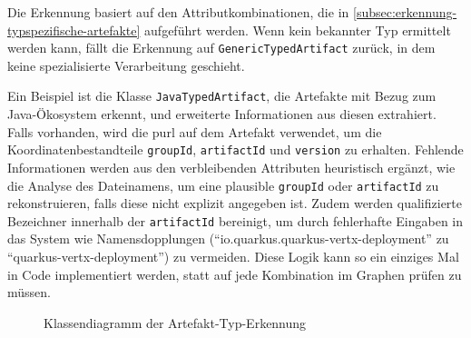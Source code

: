Die Erkennung basiert auf den Attributkombinationen, die in \autoref{subsec:erkennung-typspezifische-artefakte} aufgeführt werden.
Wenn kein bekannter Typ ermittelt werden kann, fällt die Erkennung auf \texttt{GenericTypedArtifact} zurück, in dem keine spezialisierte Verarbeitung geschieht.

Ein Beispiel ist die Klasse \texttt{JavaTypedArtifact}, die Artefakte mit Bezug zum Java-Ökosystem erkennt, und erweiterte Informationen aus diesen extrahiert.
Falls vorhanden, wird die \acrshort{purl} auf dem Artefakt verwendet, um die Koordinatenbestandteile \texttt{groupId}, \texttt{artifactId} und \texttt{version} zu erhalten.
Fehlende Informationen werden aus den verbleibenden Attributen heuristisch ergänzt, wie die Analyse des Dateinamens, um eine plausible \texttt{groupId} oder \texttt{artifactId} zu rekonstruieren, falls diese nicht explizit angegeben ist.
Zudem werden qualifizierte Bezeichner innerhalb der \texttt{artifactId} bereinigt, um durch fehlerhafte Eingaben in das System wie Namensdopplungen (\enquote{io.quarkus.quarkus-vertx-deployment} zu \enquote{quarkus-vertx-deployment}) zu vermeiden.
Diese Logik kann so ein einziges Mal in Code implementiert werden, statt auf jede Kombination im Graphen prüfen zu müssen.

\begin{figure}[htbp]
    \centering
    \makebox[\textwidth]{}
    \caption{Klassendiagramm der Artefakt-Typ-Erkennung}
    \label{fig:impl-class-diagram-typed-artifacts}
\end{figure}

